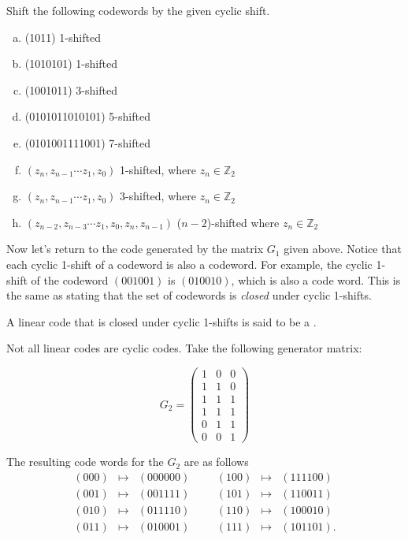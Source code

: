 \begin{exercise}{}
Shift the following codewords by the given cyclic shift.
\begin{enumerate}[(a)]
\item (1011)  1-shifted
\item (1010101)  1-shifted
\item (1001011)  3-shifted
\item (0101011010101) 5-shifted
\item (0101001111001)  7-shifted
\item $(z_n, z_{n-1} \cdots z_1,z_0)$  1-shifted, where $z_n \in \mathbb{Z}_2$
\item $(z_n, z_{n-1} \cdots z_1,z_0)$  3-shifted, where $z_n \in \mathbb{Z}_2$
\item $(z_{n-2}, z_{n-3} \cdots z_1, z_0, z_{n},z_{n-1})$ ($n-2$)-shifted where $z_n \in \mathbb{Z}_2$
\end {enumerate}
\end {exercise}

Now let's return to the code generated by the matrix $G_1$ given above. Notice that each cyclic 1-shift of a codeword is also a codeword.  For example, the cyclic 1-shift of the codeword $(001001)$ is $(010010)$, which is also a code word.  This is the same as stating that the set of codewords is \emph{closed} under cyclic 1-shifts.  

\begin{defn}\label{def:cycliccode}
A linear code that is closed under cyclic 1-shifts is said to be a .  
\end {defn}

Not all linear codes are cyclic codes.  Take the following generator matrix: 

\[
G_2 = 
\begin{pmatrix}
1 & 0 & 0 \\
1 & 1 & 0 \\
1 & 1 & 1 \\
1 & 1 & 1 \\
0 & 1 & 1 \\
0 & 0 & 1
\end{pmatrix}
\]

The resulting code words for the $G_2$ are as follows\[
\begin{array}{rclccrcl}
(000) & \mapsto & (000000) & & & (100) & \mapsto & (111100) \\
(001) & \mapsto & (001111) & & & (101) & \mapsto & (110011) \\
(010) & \mapsto & (011110) & & & (110) & \mapsto & (100010) \\
(011) & \mapsto & (010001) & & & (111) & \mapsto & (101101).
\end{array}
\]


